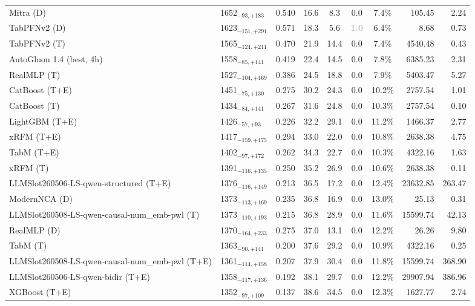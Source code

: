 \begin{tabular}{llcccccrr}
Mitra (D) & 1652${}_{-93,+183}$ & 0.540 & 16.6 & 8.3 & 0.0 & 7.4\% & 105.45 & 2.24 \\
TabPFNv2 (D) & 1623${}_{-151,+291}$ & 0.571 & 18.3 & 5.6 & \textcolor{silver}{\textbf{1.0}} & 6.4\% & 8.68 & 0.73 \\
TabPFNv2 (T) & 1565${}_{-124,+211}$ & 0.470 & 21.9 & 14.4 & 0.0 & 7.4\% & 4540.48 & 0.43 \\
AutoGluon 1.4 (best, 4h) & 1558${}_{-85,+141}$ & 0.419 & 22.4 & 14.5 & 0.0 & 7.8\% & 6385.23 & 2.31 \\
RealMLP (T) & 1527${}_{-104,+169}$ & 0.386 & 24.5 & 18.8 & 0.0 & 7.9\% & 5403.47 & 5.27 \\
CatBoost (T+E) & 1451${}_{-75,+130}$ & 0.275 & 30.2 & 24.3 & 0.0 & 10.2\% & 2757.54 & 1.01 \\
CatBoost (T) & 1434${}_{-84,+141}$ & 0.267 & 31.6 & 24.8 & 0.0 & 10.3\% & 2757.54 & 0.10 \\
LightGBM (T+E) & 1426${}_{-57,+93}$ & 0.226 & 32.2 & 29.1 & 0.0 & 11.2\% & 1466.37 & 2.77 \\
xRFM (T+E) & 1417${}_{-159,+175}$ & 0.294 & 33.0 & 22.0 & 0.0 & 10.8\% & 2638.38 & 4.75 \\
TabM (T+E) & 1402${}_{-97,+172}$ & 0.262 & 34.3 & 22.7 & 0.0 & 10.3\% & 4322.16 & 1.63 \\
xRFM (T) & 1391${}_{-116,+135}$ & 0.250 & 35.2 & 26.9 & 0.0 & 10.6\% & 2638.38 & 0.11 \\
LLMSlot260506-LS-qwen-structured (T+E) & 1376${}_{-116,+149}$ & 0.213 & 36.5 & 17.2 & 0.0 & 12.4\% & 23632.85 & 263.47 \\
ModernNCA (D) & 1373${}_{-113,+169}$ & 0.235 & 36.8 & 16.9 & 0.0 & 13.0\% & 25.13 & 0.31 \\
LLMSlot260508-LS-qwen-causal-num_emb-pwl (T) & 1373${}_{-110,+193}$ & 0.215 & 36.8 & 28.9 & 0.0 & 11.6\% & 15599.74 & 42.13 \\
RealMLP (D) & 1370${}_{-164,+233}$ & 0.275 & 37.0 & 13.1 & 0.0 & 12.2\% & 26.26 & 9.80 \\
TabM (T) & 1363${}_{-90,+141}$ & 0.200 & 37.6 & 29.2 & 0.0 & 10.9\% & 4322.16 & 0.25 \\
LLMSlot260508-LS-qwen-causal-num_emb-pwl (T+E) & 1361${}_{-114,+158}$ & 0.207 & 37.9 & 30.4 & 0.0 & 11.8\% & 15599.74 & 368.90 \\
LLMSlot260506-LS-qwen-bidir (T+E) & 1358${}_{-117,+136}$ & 0.192 & 38.1 & 29.7 & 0.0 & 12.2\% & 29907.94 & 386.96 \\
XGBoost (T+E) & 1352${}_{-97,+109}$ & 0.137 & 38.6 & 34.5 & 0.0 & 12.3\% & 1627.77 & 2.74 \\

\end{tabular}
